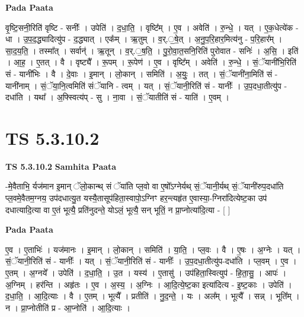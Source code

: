 \documentclass[17pt]{extarticle}
\begin{document}
\textbf{Pada Paata} \newline

वृ॒ष्टि॒सनी॒रिति॑ वृष्टि - सनीः᳚ । उपेति॑ । द॒धा॒ति॒ । वृष्टि᳚म् । ए॒व । अवेति॑ । रु॒न्धे॒ । यत् । ए॒क॒धेत्ये॑क - धा । उ॒प॒द॒द्ध्यादित्यु॑प - द॒द्ध्यात् । एक᳚म् । ऋ॒तुम् । व॒र्.॒षे॒त् । अ॒नु॒प॒रि॒हार॒मित्य॑नु - प॒रि॒हार᳚म् । सा॒द॒य॒ति॒ । तस्मा᳚त् । सर्वान्॑ । ऋ॒तून् । व॒र्.॒ष॒ति॒ । पु॒रो॒वा॒त॒सनि॒रिति॑ पुरोवात - सनिः॑ । अ॒सि॒ । इति॑ । आ॒ह॒ । ए॒तत् । वै । वृष्ट्यै᳚ । रू॒पम् । रू॒पेण॑ । ए॒व । वृष्टि᳚म् । अवेति॑ । रु॒न्धे॒ । सं॒ॅयानी॑भि॒रिति॑ सं - यानी॑भिः । वै । दे॒वाः । इ॒मान् । लो॒कान् । समिति॑ । अ॒युः॒ । तत् । सं॒ॅयानी॑ना॒मिति॑ सं - यानी॑नाम् । सं॒ॅया॒नि॒त्वमिति॑ संॅयानि - त्वम् । यत् । सं॒ॅयानी॒रिति॑ सं - यानीः᳚ । उ॒प॒दधा॒तीत्यु॑प - दधा॑ति । यथा᳚ । अ॒फ्स्वित्य॑प् - सु । ना॒वा । सं॒ॅयातीति॑ सं - याति॑ । ए॒वम् ।  \newline





\section{ TS 5.3.10.2 }

\textbf{TS 5.3.10.2 } \newline
\textbf{Samhita Paata} \newline

-मे॒वैताभि॒ र्यज॑मान इ॒मान् ॅलो॒कान्थ् सं ॅया॑ति प्ल॒वो वा ए॒षो᳚ऽग्नेर्यथ् सं॒ॅयानी॒र्यथ् सं॒ॅयानी॑रुप॒दधा॑ति प्ल॒वमे॒वैतम॒ग्नय॒ उप॑दधात्यु॒त यस्यै॒तासूप॑हिता॒स्वापो॒ऽग्निꣳ हर॒न्त्यहृ॑त ए॒वास्या॒-ग्निरा॑दित्येष्ट॒का उप॑ दधात्यादि॒त्या वा ए॒तं भूत्यै॒ प्रति॑नुदन्ते॒ योऽलं॒ भूत्यै॒ सन् भूतिं॒ न प्रा॒प्नोत्या॑दि॒त्या - [  ] \newline

\textbf{Pada Paata} \newline

ए॒व । ए॒ताभिः॑ । यज॑मानः । इ॒मान् । लो॒कान् । समिति॑ । या॒ति॒ । प्ल॒वः । वै । ए॒षः । अ॒ग्नेः । यत् । सं॒ॅयानी॒रिति॑ सं - यानीः᳚ । यत् । सं॒ॅयानी॒रिति॑ सं - यानीः᳚ । उ॒प॒दधा॒तीत्यु॑प-दधा॑ति । प्ल॒वम् । ए॒व । ए॒तम् । अ॒ग्नये᳚ । उपेति॑ । द॒धा॒ति॒ । उ॒त । यस्य॑ । ए॒तासु॑ । उप॑हिता॒स्वित्युप॑ - हि॒ता॒सु॒ । आपः॑ । अ॒ग्निम् । हर॑न्ति । अहृ॑तः । ए॒व । अ॒स्य॒ । अ॒ग्निः । आ॒दि॒त्ये॒ष्ट॒का इत्या॑दित्य - इ॒ष्ट॒काः । उपेति॑ । द॒धा॒ति॒ । आ॒दि॒त्याः । वै । ए॒तम् । भूत्यै᳚ । प्रतीति॑ । नु॒द॒न्ते॒ । यः । अल᳚म् । भूत्यै᳚ । सन्न् । भूति᳚म् । न । प्रा॒प्नोतीति॑ प्र - आ॒प्नोति॑ । आ॒दि॒त्याः ।  \newline
\end{document}
